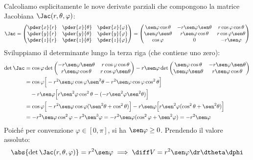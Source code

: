 \begin{dimostrazione}
Calcoliamo esplicitamente le nove derivate parziali che compongono la matrice Jacobiana $\Jac(r, \theta, \varphi)$:
\[
\Jac = \begin{pmatrix} 
\pder{x}{r} & \pder{x}{\theta} & \pder{x}{\varphi} \\ 
\pder{y}{r} & \pder{y}{\theta} & \pder{y}{\varphi} \\ 
\pder{z}{r} & \pder{z}{\theta} & \pder{z}{\varphi} 
\end{pmatrix} = 
\begin{pmatrix} 
\sen\varphi \cos\theta & -r \sen\varphi \sen\theta & r \cos\varphi \cos\theta \\ 
\sen\varphi \sen\theta & r \sen\varphi \cos\theta & r \cos\varphi \sen\theta \\ 
\cos\varphi & 0 & -r \sen\varphi 
\end{pmatrix}
\]
Sviluppiamo il determinante lungo la terza riga (che contiene uno zero):
\begin{align*}
\det \Jac &= \cos\varphi \det \begin{pmatrix} -r \sen\varphi \sen\theta & r \cos\varphi \cos\theta \\ r \sen\varphi \cos\theta & r \cos\varphi \sen\theta \end{pmatrix} - r \sen\varphi \det \begin{pmatrix} \sen\varphi \cos\theta & -r \sen\varphi \sen\theta \\ \sen\varphi \sen\theta & r \sen\varphi \cos\theta \end{pmatrix} \\
&= \cos\varphi \Big[ -r^2 \sen\varphi \cos\varphi \sen^2\theta - r^2 \sen\varphi \cos\varphi \cos^2\theta \Big] \\
&\quad - r \sen\varphi \Big[ r \sen^2\varphi \cos^2\theta - (-r \sen^2\varphi \sen^2\theta) \Big] \\
&= \cos\varphi \Big[ -r^2 \sen\varphi \cos\varphi (\sen^2\theta + \cos^2\theta) \Big] - r \sen\varphi \Big[ r \sen^2\varphi (\cos^2\theta + \sen^2\theta) \Big] \\
&= -r^2 \sen\varphi \cos^2\varphi - r^2 \sen^3\varphi = -r^2 \sen\varphi (\cos^2\varphi + \sen^2\varphi) = -r^2 \sen\varphi
\end{align*}
Poiché per convenzione $\varphi \in [0, \pi]$, si ha $\sen\varphi \ge 0$. Prendendo il valore assoluto:
\[
\abs{\det \Jac(r, \theta, \varphi)} = r^2 \sen\varphi \implies \diff V = r^2 \sen\varphi \dr \dtheta \dphi
\]
\end{dimostrazione}

